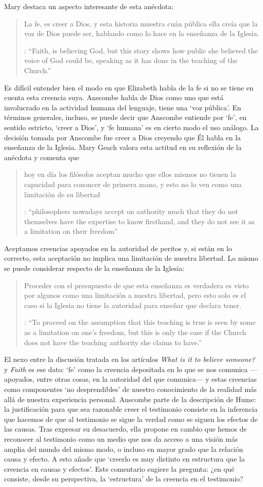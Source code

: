 Mary destaca un aspecto interesante de esta anécdota: \blockquote[{\cite[xvi--xvii]{anscombe2008faith}}: \enquote{Faith, \textelp{} is believing God, but this story shows how public she believed the voice of God could be, speaking as it has done in the teaching of the Church.}]{La fe, \textelp{} es creer a Dios, y esta historia muestra cuán pública ella creía que la voz de Dios puede ser, hablando como lo hace en la enseñanza de la Iglesia.} Es difícil entender bien el modo en que Elizabeth habla de la fe si no se tiene en cuenta esta creencia suya. Anscombe habla de Dios como uno que está involucrado en la actividad humana del lenguaje, tiene una `voz pública'. En términos generales, incluso, se puede decir que Anscombe entiende por `fe', en sentido estricto, `creer a Dios', y `fe humana' es en cierto modo el uso análogo. La decisión tomada por Anscombe fue creer a Dios creyendo que Él habla en la enseñanza de la Iglesia. Mary Geach valora esta actitud en su reflexión de la anécdota y comenta que \blockquote[{\cite[xvii]{anscombe2008faith}}: \enquote{philosophers nowadays accept on authority much that they do not themselves have the expertise to know firsthand, and they do not see it as a limitation on their freedom}]{hoy en día los filósofos aceptan mucho que ellos mismos no tienen la capacidad para cononcer de primera mano, y esto no lo ven como una limitación de su libertad}. Aceptamos creencias apoyados en la autoridad de peritos y, si están en lo correcto, esta aceptación no implica una limitación de nuestra libertad. Lo mismo se puede considerar respecto de la enseñanza de la Iglesia: \blockquote[{\cite[xvi--xvii]{anscombe2008faith}}: \enquote{To proceed on the assumption that this teaching is true is seen by some as a limitation on one's freedom, but this is only the case if the Church does not have the teaching authority she claims to have.}]{Proceder con el presupuesto de que esta enseñanza es verdadera es visto por algunos como una limitación a nuestra libertad, pero esto solo es el caso si la Iglesia no tiene la autoridad para enseñar que declara tener.}

El nexo entre la discusión tratada en los artículos \emph{What is it to believe someone?} y \emph{Faith} es ese dato: `fe' como la creencia depositada en lo que se nos comunica ---apoyados, entre otras cosas, en la autoridad del que comunica--- y estas creencias como componentes `no desprendibles' de nuestro conocimiento de la realidad más allá de nuestra experiencia personal. Anscombe parte de la descripción de Hume: la justificación para que sea razonable creer el testimonio consiste en la inferencia que hacemos de que al testimonio se sigue la verdad como se siguen los efectos de las causas. Tras expresar su desacuerdo, ella propone en cambio que hemos de reconocer al testimonio como un medio que nos da acceso a una visión más amplia del mundo del mismo modo, o incluso en mayor grado que la relación causa y efecto. A esto añade que \enquote*{creerlo es muy distinto en estructura que la creencia en causas y efectos}. Este comentario sugiere la pregunta: ¿en qué consiste, desde su perspectiva, la `estructura' de la creencia en el testimonio?

